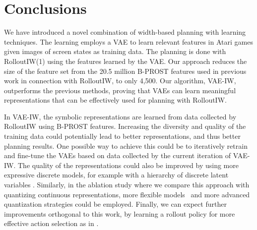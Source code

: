 \section{Conclusions}
We have introduced a novel combination of width-based planning with learning techniques. The learning employs a VAE to learn relevant features in Atari games given images of screen states as training data. The planning is done with RolloutIW(1) using the features learned by the VAE. 
Our approach reduces the size of the feature set from the 20.5 million B-PROST features used in previous work in connection with RolloutIW, to only 4,500. Our algorithm, VAE-IW, outperforms the previous methods, proving that VAEs can learn meaningful representations that can be effectively used for planning with RolloutIW.

In VAE-IW, the symbolic representations are learned from data collected by RolloutIW using B-PROST features. Increasing the diversity and quality of the training data could potentially lead to better representations, and thus better planning results.
One possible way to achieve this could be to iteratively retrain and fine-tune the VAEs based on data collected by the current iteration of VAE-IW. 
The quality of the representations could also be improved by using more expressive discrete models, for example with a hierarchy of discrete latent variables \cite{van2017neural,razavi2019generating}.
Similarly, in the ablation study where we compare this approach with quantizing continuous representations, more flexible models~\cite{ranganath2016hierarchical,sonderby2016ladder,vahdat2020nvae} and more advanced quantization strategies could be employed.
Finally, we can expect further improvements orthogonal to this work, by learning a rollout policy for more effective action selection as in \citet{RLIW}.
